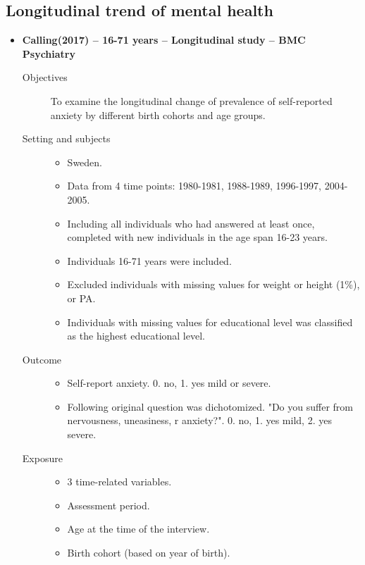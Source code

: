 \documentclass{article}
\begin{document}
\subsection{Longitudinal trend of mental health}
\begin{itemize}
	\item{\bf Calling(2017) -- 16-71 years -- Longitudinal study -- BMC Psychiatry} 
		\begin{description}
			\item[Objectives]\mbox{}\par
				To examine the longitudinal change of prevalence of self-reported anxiety by different birth cohorts and age groups.
			\item[Setting and subjects]\mbox{}\par 
				\begin{itemize}
					\item Sweden. 
					\item Data from 4 time points: 1980-1981, 1988-1989, 1996-1997, 2004-2005.
					\item Including all individuals who had answered at least once, completed with new individuals in the age span 16-23 years. 
					\item Individuals 16-71 years were included.
					\item Excluded individuals with missing values for weight or height (1\%), or PA.
					\item Individuals with missing values for educational level was classified as the highest educational level.
				\end{itemize}
			\item[Outcome]\mbox{}\par
				\begin{itemize}
					\item Self-report anxiety. 0. no, 1. yes mild or severe.
					\item Following original question was dichotomized. "Do you suffer from nervousness, uneasiness, r anxiety?". 0. no, 1. yes mild, 2. yes severe.
				\end{itemize}
			\item[Exposure] \mbox{}\par
				\begin{itemize}
					\item 3 time-related variables.
					\item Assessment period.
					\item Age at the time of the interview. 
					\item Birth cohort (based on year of birth).

\end{itemize}
\end{description}
\end{itemize}
\end{document}
